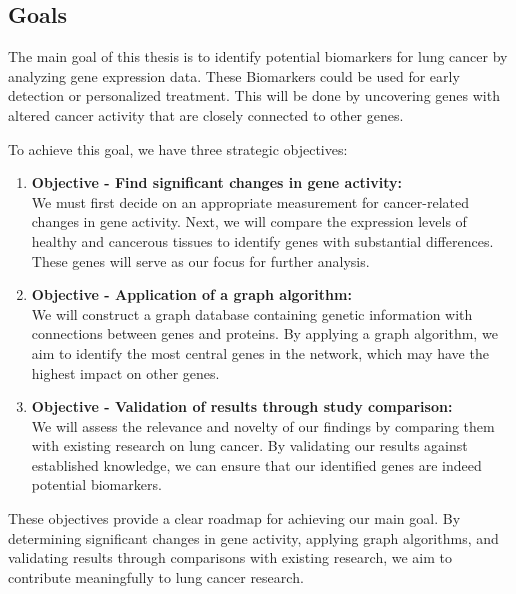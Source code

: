 \subsection{Goals} \label{subsec:goals}
The main goal of this thesis is to identify potential biomarkers for lung cancer by analyzing gene expression data.
These Biomarkers could be used for early detection or personalized treatment.
This will be done by uncovering genes with altered cancer activity that are closely connected to other genes.

To achieve this goal, we have three strategic objectives:
\begin{enumerate}
    \item \textbf{Objective - Find significant changes in gene activity:}\\
    We must first decide on an appropriate measurement for cancer-related changes in gene activity.
    Next, we will compare the expression levels of healthy and cancerous tissues to identify genes with substantial differences.
    These genes will serve as our focus for further analysis.
    \label{obj:delta_tpm}

    \item \textbf{Objective - Application of a graph algorithm:}\\
    We will construct a graph database containing genetic information with connections between genes and proteins.
    By applying a graph algorithm, we aim to identify the most central genes in the network,
    which may have the highest impact on other genes.
    \label{obj:graph_algorithm}

    \item \textbf{Objective - Validation of results through study comparison:}\\
    We will assess the relevance and novelty of our findings by comparing them with existing research on lung cancer.
    By validating our results against established knowledge, we can ensure that our identified genes are indeed potential biomarkers.
    \label{obj:validation}
\end{enumerate}

These objectives provide a clear roadmap for achieving our main goal.
By determining significant changes in gene activity, applying graph algorithms,
and validating results through comparisons with existing research,
we aim to contribute meaningfully to lung cancer research.
